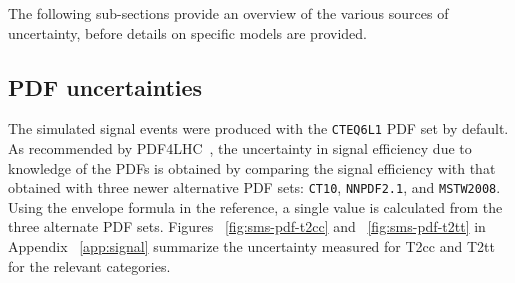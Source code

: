 The following sub-sections provide an overview of the various sources of
uncertainty, before details on specific models are provided. 
%
%
%
%
\subsection{PDF uncertainties\label{sec:pdf-sets}}

The simulated signal events were produced with the \verb!CTEQ6L1! PDF
set by default.  As recommended by PDF4LHC~\cite{pdf4lhc}, the uncertainty
in signal efficiency due to knowledge of the PDFs is obtained by comparing 
the signal efficiency with that obtained with three newer alternative PDF 
sets: \verb!CT10!, \verb!NNPDF2.1!, and \verb!MSTW2008!. Using the envelope
formula in the reference, a single value is calculated from the three alternate
PDF sets. Figures ~\ref{fig:sms-pdf-t2cc} and ~\ref{fig:sms-pdf-t2tt} in Appendix
 ~\ref{app:signal} summarize the uncertainty measured for T2cc and T2tt 
for the relevant categories. 

